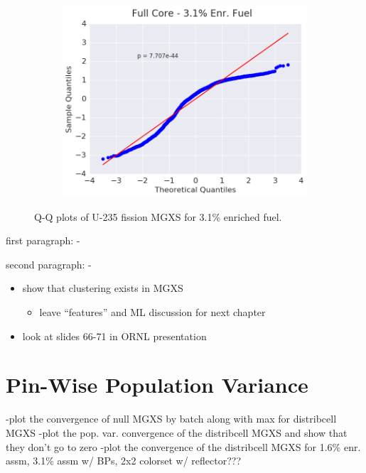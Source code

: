 \begin{figure}[h!]
\begin{subfigure}{0.5\textwidth}
  \includegraphics[width=\linewidth]{figures/patterns/full-core/quantile/31-enr-fiss-2} \caption{}
  \label{fig:chap9-qq-full-core-3.1-fiss}
\end{subfigure}
\caption[Q-Q plots of U-235 fission MGXS 3.1\% enriched fuel]{Q-Q plots of U-235 fission \ac{MGXS} for 3.1\% enriched fuel.}
\label{fig:chap9-qq-3.1-fiss}
\end{figure}


first paragraph:
-

second paragraph:
-

\begin{itemize}[noitemsep]
  \item show that clustering exists in MGXS
  \begin{itemize}[noitemsep]
    \item leave ``features'' and ML discussion for next chapter
  \end{itemize}
  \item look at slides 66-71 in ORNL presentation
\end{itemize}


\section{Pin-Wise Population Variance}

-plot the convergence of null MGXS by batch along with max for distribcell MGXS
-plot the pop. var. convergence of the distribcell MGXS and show that they don't go to zero
-plot the convergence of the distribcell MGXS for 1.6\% enr. assm, 3.1\% assm w/ BPs, 2x2 colorset w/ reflector???

